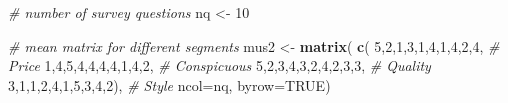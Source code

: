 \documentclass[12pt,]{krantz}
\makeatletter
\newenvironment{Shaded}{\begin{snugshade}}{\end{snugshade}}
\newcommand{\CommentTok}[1]{\textcolor[rgb]{0.37,0.37,0.37}{\textit{#1}}}
\newcommand{\DataTypeTok}[1]{\textcolor[rgb]{0.27,0.27,0.27}{#1}}
\newcommand{\DecValTok}[1]{\textcolor[rgb]{0.06,0.06,0.06}{#1}}
\newcommand{\KeywordTok}[1]{\textcolor[rgb]{0.27,0.27,0.27}{\textbf{#1}}}
\newcommand{\NormalTok}[1]{#1}
\newcommand{\OtherTok}[1]{\textcolor[rgb]{0.37,0.37,0.37}{#1}}
\newcommand{\StringTok}[1]{\textcolor[rgb]{0.5,0.5,0.5}{#1}}
\newenvironment{kframe}{%
\medskip{}
\setlength{\fboxsep}{.8em}
 \def\at@end@of@kframe{}%
 \ifinner\ifhmode%
  \def\at@end@of@kframe{\end{minipage}}%
  \begin{minipage}{\columnwidth}%
 \fi\fi%
 \def\FrameCommand##1{\hskip\@totalleftmargin \hskip-\fboxsep
 \colorbox{shadecolor}{##1}\hskip-\fboxsep
     \hskip-\linewidth \hskip-\@totalleftmargin \hskip\columnwidth}%
 \MakeFramed {\advance\hsize-\width
   \@totalleftmargin\z@ \linewidth\hsize
   \@setminipage}}%
 {\par\unskip\endMakeFramed%
 \at@end@of@kframe}
\renewenvironment{Shaded}{\begin{kframe}}{\end{kframe}}
\makeatother
\begin{document}
\begin{Shaded}
\begin{Highlighting}[]
\CommentTok{# number of survey questions}
\NormalTok{nq <-}\StringTok{ }\DecValTok{10}

\CommentTok{# mean matrix for different segments }
\NormalTok{mus2 <-}\StringTok{ }\KeywordTok{matrix}\NormalTok{( }\KeywordTok{c}\NormalTok{( }\DecValTok{5}\NormalTok{,}\DecValTok{2}\NormalTok{,}\DecValTok{1}\NormalTok{,}\DecValTok{3}\NormalTok{,}\DecValTok{1}\NormalTok{,}\DecValTok{4}\NormalTok{,}\DecValTok{1}\NormalTok{,}\DecValTok{4}\NormalTok{,}\DecValTok{2}\NormalTok{,}\DecValTok{4}\NormalTok{, }\CommentTok{# Price}
  \DecValTok{1}\NormalTok{,}\DecValTok{4}\NormalTok{,}\DecValTok{5}\NormalTok{,}\DecValTok{4}\NormalTok{,}\DecValTok{4}\NormalTok{,}\DecValTok{4}\NormalTok{,}\DecValTok{4}\NormalTok{,}\DecValTok{1}\NormalTok{,}\DecValTok{4}\NormalTok{,}\DecValTok{2}\NormalTok{, }\CommentTok{# Conspicuous}
  \DecValTok{5}\NormalTok{,}\DecValTok{2}\NormalTok{,}\DecValTok{3}\NormalTok{,}\DecValTok{4}\NormalTok{,}\DecValTok{3}\NormalTok{,}\DecValTok{2}\NormalTok{,}\DecValTok{4}\NormalTok{,}\DecValTok{2}\NormalTok{,}\DecValTok{3}\NormalTok{,}\DecValTok{3}\NormalTok{, }\CommentTok{# Quality}
  \DecValTok{3}\NormalTok{,}\DecValTok{1}\NormalTok{,}\DecValTok{1}\NormalTok{,}\DecValTok{2}\NormalTok{,}\DecValTok{4}\NormalTok{,}\DecValTok{1}\NormalTok{,}\DecValTok{5}\NormalTok{,}\DecValTok{3}\NormalTok{,}\DecValTok{4}\NormalTok{,}\DecValTok{2}\NormalTok{), }\CommentTok{# Style}
\DataTypeTok{ncol=}\NormalTok{nq, }\DataTypeTok{byrow=}\OtherTok{TRUE}\NormalTok{) }


\end{Highlighting}
\end{Shaded}
\end{document}
